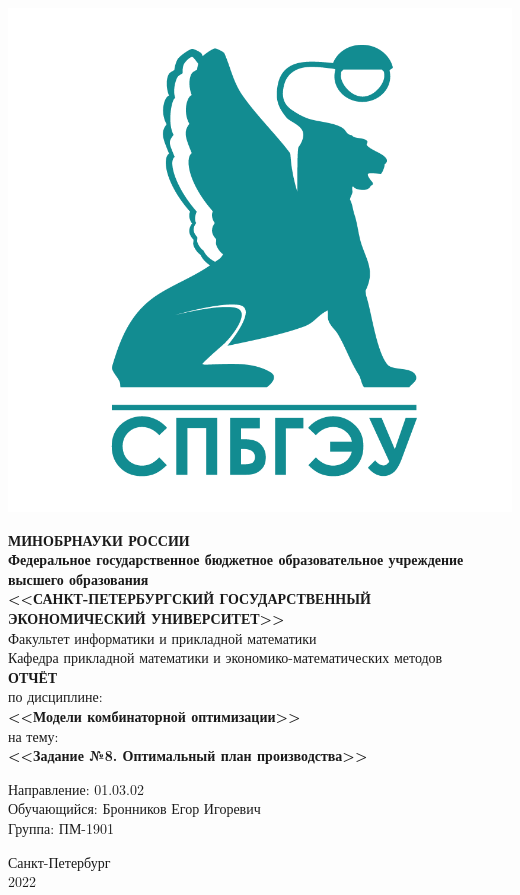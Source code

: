 \documentclass[14pt,fleqn]{extarticle}
\begin{document}
	\begin{titlepage}
		\includegraphics[scale=0.12]{logo}
		\begin{center}
			\textbf{МИНОБРНАУКИ РОССИИ}\\
			\vspace{0.2cm}
			\textbf{Федеральное государственное бюджетное образовательное учреждение высшего образования}\\
			\textbf{<<САНКТ-ПЕТЕРБУРГСКИЙ ГОСУДАРСТВЕННЫЙ ЭКОНОМИЧЕСКИЙ УНИВЕРСИТЕТ>>}\\
			\vspace{0.6cm}
			Факультет информатики и прикладной математики\\
			Кафедра прикладной математики и экономико-математических методов\\
			\vspace{1cm}
			\textbf{ОТЧЁТ}\\
			по дисциплине:\\
			\textbf{<<Модели комбинаторной оптимизации>>}\\
			на тему:\\
			\textbf{<<Задание №8. Оптимальный план производства>>}\\
		\end{center}
		\vspace{1cm}
		Направление: 01.03.02\\
		Обучающийся: Бронников Егор Игоревич\\
		Группа: ПМ-1901\\
		\vfill
		\begin{center}
			Санкт-Петербург\\
			2022\\
		\end{center}
	\end{titlepage}
	
\end{document}
